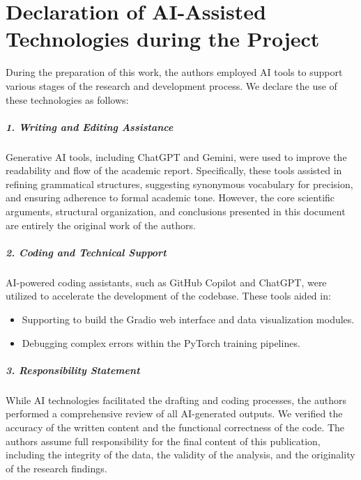 \chapter{Declaration of AI-Assisted Technologies during the Project}\label{chapter:decl}

During the preparation of this work, the authors employed AI tools to support various stages of the research and development process. We declare the use of these technologies as follows:

\paragraph{1. Writing and Editing Assistance}
Generative AI tools, including ChatGPT and Gemini, were used to improve the readability and flow of the academic report. Specifically, these tools assisted in refining grammatical structures, suggesting synonymous vocabulary for precision, and ensuring adherence to formal academic tone. However, the core scientific arguments, structural organization, and conclusions presented in this document are entirely the original work of the authors.

\paragraph{2. Coding and Technical Support}
AI-powered coding assistants, such as GitHub Copilot and ChatGPT, were utilized to accelerate the development of the codebase. These tools aided in:
\begin{itemize}
    \item Supporting to build the Gradio web interface and data visualization modules.
    \item Debugging complex errors within the PyTorch training pipelines.
\end{itemize}

\paragraph{3. Responsibility Statement}
While AI technologies facilitated the drafting and coding processes, the authors performed a comprehensive review of all AI-generated outputs. We verified the accuracy of the written content and the functional correctness of the code. The authors assume full responsibility for the final content of this publication, including the integrity of the data, the validity of the analysis, and the originality of the research findings.